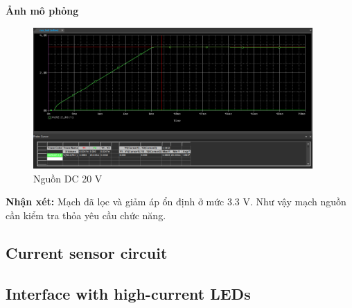 \textbf{Ảnh mô phỏng}
\begin{figure}[ht]
    \centering
    \includegraphics[width=0.95\textwidth]{graphics/section4/f4.png}
    \caption{Nguồn DC 20 V}
\end{figure}

\textbf{Nhận xét: }Mạch đã lọc và giảm áp ổn định ở mức 3.3 V. Như vậy mạch nguồn cần kiểm tra thỏa yêu cầu chức năng.
\pagebreak
\subsection{Current sensor circuit}
\subsection{Interface with high-current LEDs}

